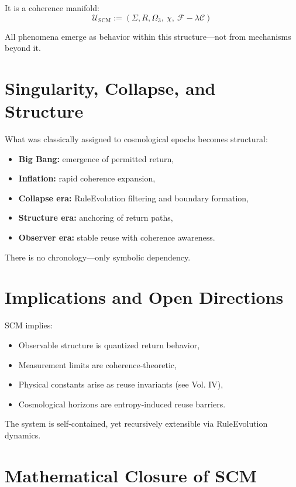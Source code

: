 It is a coherence manifold:
\[
\mathcal{U}_{\text{SCM}} := (\Sigma, R, \Omega_3,\ \chi,\ \mathcal{F} - \lambda\mathcal{C})
\]

All phenomena emerge as behavior within this structure—not from mechanisms beyond it.

\section{Singularity, Collapse, and Structure} \label{sec:singularity-collapse}

What was classically assigned to cosmological epochs becomes structural:

\begin{itemize}
  \item \textbf{Big Bang:} emergence of permitted return,
  \item \textbf{Inflation:} rapid coherence expansion,
  \item \textbf{Collapse era:} RuleEvolution filtering and boundary formation,
  \item \textbf{Structure era:} anchoring of return paths,
  \item \textbf{Observer era:} stable reuse with coherence awareness.
\end{itemize}

There is no chronology—only symbolic dependency.

\section{Implications and Open Directions} \label{sec:implications}

SCM implies:
\begin{itemize}
  \item Observable structure is quantized return behavior,
  \item Measurement limits are coherence-theoretic,
  \item Physical constants arise as reuse invariants (see Vol. IV),
  \item Cosmological horizons are entropy-induced reuse barriers.
\end{itemize}

The system is self-contained, yet recursively extensible via RuleEvolution dynamics.

\section{Mathematical Closure of SCM} \label{sec:closure}

